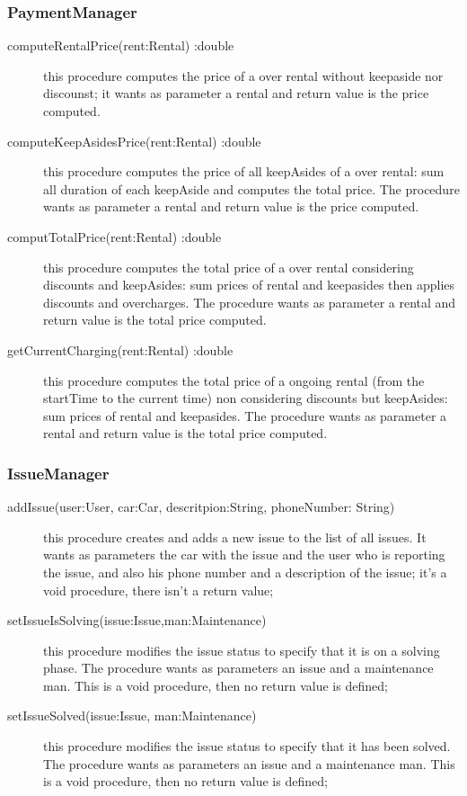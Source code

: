 \documentclass{scrreprt}
\begin{document}
\subsubsection{PaymentManager}
\begin{description}
\item[computeRentalPrice(rent:Rental) :double] this procedure computes the price of a over rental without keepaside nor discounst; it wants as parameter a rental and return value is the price computed. 
\item[computeKeepAsidesPrice(rent:Rental) :double] this procedure computes the price of all keepAsides of a over rental: sum all duration of each keepAside and computes the total price. The procedure wants as parameter a rental and return value is the price computed.
\item[computTotalPrice(rent:Rental) :double] this procedure computes the total price of a over rental considering discounts and keepAsides: sum prices of rental and keepasides then applies discounts and overcharges. The procedure wants as parameter a rental and return value is the total price computed.
\item[getCurrentCharging(rent:Rental) :double] this procedure computes the total price of a ongoing rental (from the startTime to the current time) non considering discounts but keepAsides: sum prices of rental and keepasides. The procedure wants as parameter a rental and return value is the total price computed.
\end{description}

\subsubsection{IssueManager}
\begin{description}
\item[addIssue(user:User, car:Car, descritpion:String, phoneNumber: String)] this procedure creates and adds a new issue to the list of all issues. It wants as parameters the car with the issue and the user who is reporting the issue, and also his phone number and a description of the issue; it's a void procedure, there isn't a return value;
\item[setIssueIsSolving(issue:Issue,man:Maintenance)] this procedure modifies the issue status to specify that it is on a solving phase. The procedure wants as parameters an issue and a maintenance man. This is a void procedure, then no return value is defined;
\item[setIssueSolved(issue:Issue, man:Maintenance)] this procedure modifies the issue status to specify that it has been solved. The procedure wants as parameters an issue and a maintenance man. This is a void procedure, then no return value is defined;
\end{description}
\end{document}
